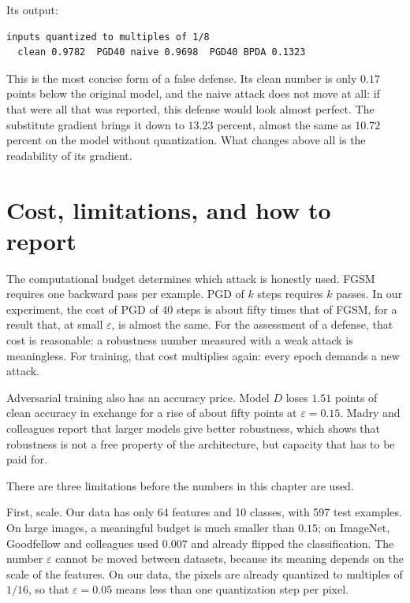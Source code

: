 Its output:

\begin{verbatim}
inputs quantized to multiples of 1/8
  clean 0.9782  PGD40 naive 0.9698  PGD40 BPDA 0.1323
\end{verbatim}

This is the most concise form of a false defense. Its clean number is only $0.17$
points below the original model, and the naive attack does not move at all: if that
were all that was reported, this defense would look almost perfect. The substitute
gradient brings it down to $13.23$ percent, almost the same as $10.72$ percent on the
model without quantization. What changes above all is the readability of its gradient.

\section{Cost, limitations, and how to report}

The computational budget determines which attack is honestly used. FGSM requires one
backward pass per example. PGD of $k$ steps requires $k$ passes. In our experiment, the
cost of PGD of 40 steps is about fifty times that of FGSM, for a result that, at small
$\varepsilon$, is almost the same. For the assessment of a defense, that cost is
reasonable: a robustness number measured with a weak attack is meaningless. For
training, that cost multiplies again: every epoch demands a new attack.

Adversarial training also has an accuracy price. Model $D$ loses $1.51$ points of
clean accuracy in exchange for a rise of about fifty points at $\varepsilon=0.15$.
Madry and colleagues report that larger models give better robustness, which shows
that robustness is not a free property of the architecture, but capacity that has to
be paid for.

There are three limitations before the numbers in this chapter are used.

First, scale. Our data has only 64 features and 10 classes, with 597 test examples. On
large images, a meaningful budget is much smaller than $0.15$; on ImageNet,
Goodfellow and colleagues used $0.007$ and already flipped the classification. The
number $\varepsilon$ cannot be moved between datasets, because its meaning depends on
the scale of the features. On our data, the pixels are already quantized to multiples
of $1/16$, so that $\varepsilon=0.05$ means less than one quantization step per
pixel.

